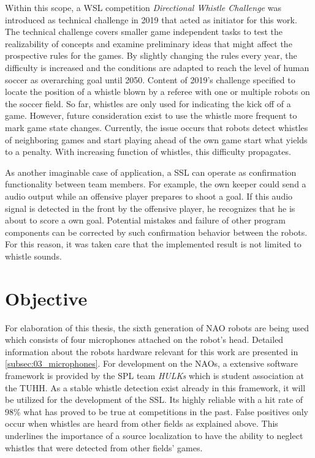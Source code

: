 Within this scope, a \acf{WSL} competition \textit{Directional Whistle Challenge} was
introduced as technical challenge in 2019 that acted as initiator for this work.
The technical challenge covers smaller game independent tasks to test the realizability of
concepts and examine preliminary ideas that might affect the prospective rules for the games.
By slightly changing the rules every year, the difficulty is increased and the conditions
are adapted to reach the level of human soccer as overarching goal until 2050.
Content of 2019's challenge specified to locate the position of a whistle blown by a referee
with one or multiple robots on the soccer field.
So far, whistles are only used for indicating the kick off of a game.
However, future consideration exist to use the whistle more frequent
to mark game state changes.
Currently, the issue occurs that robots detect whistles of neighboring
games and start playing ahead of the own game start what yields to a penalty.
With increasing function of whistles, this difficulty propagates.

As another imaginable case of application, a \ac{SSL} can operate as confirmation
functionality between team members.
For example, the own keeper could send a audio output while an offensive player prepares
to shoot a goal.
If this audio signal is detected in the front by the offensive player, he recognizes
that he is about to score a own goal.
Potential mistakes and failure of other program components can be corrected by such
confirmation behavior between the robots.
For this reason, it was taken care that the implemented result is not limited to
whistle sounds.

\section{Objective}
\label{sec:01_objective}

For elaboration of this thesis, the sixth generation of NAO robots are being used
which consists of four microphones attached on the robot's head.
Detailed information about the robots hardware relevant for this work are presented
in \cref{subsec:03_microphones}.
For development on the NAOs, a extensive software framework is provided by the
\ac{SPL} team \textit{HULKs} which is student association at the \ac{TUHH}.
As a stable whistle detection exist already in this framework,
it will be utilized for the development of the \ac{SSL}.
Its highly reliable with a hit rate of 98\si{\percent} \cite{Hasselbring} what has proved to be true at
competitions in the past.
False positives only occur when whistles are heard from other fields as explained above.
This underlines the importance of a source localization to have the ability to neglect whistles
that were detected from other fields' games.

